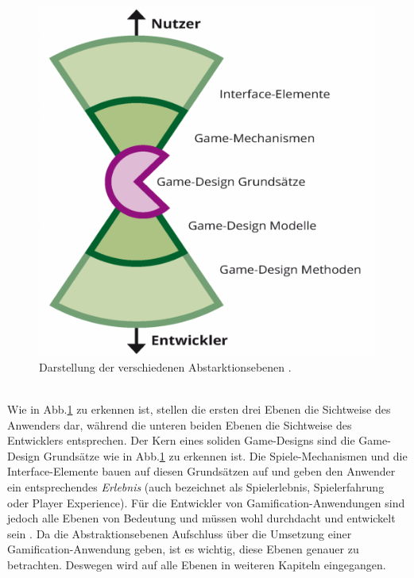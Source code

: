 \documentclass[a4paper,12pt,twoside]{scrartcl}
\begin{document}
\begin{figure}[h!]
\begin{center}
\includegraphics[scale = 0.3]{Bilder/GameElemente.eps}
\caption{Darstellung der verschiedenen Abstarktionsebenen \cite{GameElemente2018}.}
\label{GameElementeBild}
\end{center}
\end{figure}
\\
Wie in Abb.\ref{GameElementeBild} zu erkennen ist, stellen die ersten drei Ebenen die Sichtweise des Anwenders dar, während die unteren beiden Ebenen die Sichtweise des Entwicklers entsprechen. Der Kern eines soliden Game-Designs sind die Game-Design Grundsätze wie in Abb.\ref{GameElementeBild} zu erkennen ist. Die Spiele-Mechanismen und die Interface-Elemente bauen auf diesen Grundsätzen auf und geben den Anwender ein entsprechendes \textit{Erlebnis} (auch bezeichnet als Spielerlebnis, Spielerfahrung oder Player Experience). Für die Entwickler von Gamification-Anwendungen sind jedoch alle Ebenen von Bedeutung und müssen wohl durchdacht und entwickelt sein \cite{GameElemente2018}. Da die Abstraktionsebenen Aufschluss über die Umsetzung einer Gamification-Anwendung geben, ist es wichtig, diese Ebenen genauer zu betrachten. Deswegen wird auf alle Ebenen in weiteren Kapiteln eingegangen.
\end{document}

